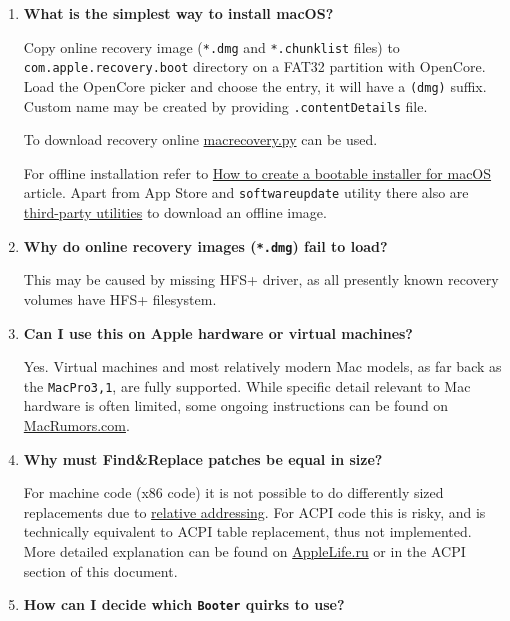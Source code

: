 \documentclass[]{article}
\begin{document}
\begin{enumerate}
\item \label{reinstallmacos}
  \textbf{What is the simplest way to install macOS?}

  Copy online recovery image (\texttt{*.dmg} and \texttt{*.chunklist} files)
  to \texttt{com.apple.recovery.boot} directory on a FAT32 partition with OpenCore.
  Load the OpenCore picker and choose the entry, it will have a \texttt{(dmg)} suffix.
  Custom name may be created by providing \texttt{.contentDetails} file.

  To download recovery online
  \href{https://github.com/acidanthera/OpenCorePkg/blob/master/Utilities/macrecovery/macrecovery.py}{macrecovery.py}
  can be used.

  For offline installation refer to
  \href{https://support.apple.com/HT201372}{How to create a bootable installer for macOS}
  article. Apart from App Store and \texttt{softwareupdate} utility there also are
  \href{https://github.com/corpnewt/gibMacOS}{third-party utilities} to download an offline image.

\item
  \textbf{Why do online recovery images (\texttt{*.dmg}) fail to load?}

  This may be caused by missing HFS+ driver, as all presently known recovery volumes
  have HFS+ filesystem.

\item
  \textbf{Can I use this on Apple hardware or virtual machines?}

  Yes. Virtual machines and most relatively modern Mac models, as far back as the \texttt{MacPro3,1},
  are fully supported. While specific detail relevant to Mac hardware is often limited,
  some ongoing instructions can be found on
  \href{https://forums.macrumors.com/threads/2207814}{MacRumors.com}.

\item
  \textbf{Why must Find\&Replace patches be equal in size?}

  For machine code (x86 code) it is not possible to do differently sized replacements due to
  \href{https://en.wikipedia.org/w/index.php?title=Relative_addressing}{relative addressing}.
  For ACPI code this is risky, and is technically equivalent to ACPI table replacement,
  thus not implemented. More detailed explanation can be found on
  \href{https://applelife.ru/posts/819790}{AppleLife.ru} or in the ACPI section of this document.

\item
  \textbf{How can I decide which \texttt{Booter} quirks to use?}


\end{enumerate}
\end{document}
